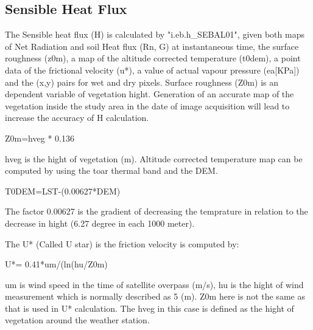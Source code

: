 \subsection{Sensible Heat Flux}
The Sensible heat flux (H) is calculated by "i.eb.h\_SEBAL01", given both maps of Net Radiation and soil Heat flux (Rn, G) at instantaneous time, the surface roughness (z0m), a map of the altitude corrected temperature (t0dem), a point data of the frictional velocity (u*), a value of actual vapour pressure (ea[KPa]) and the (x,y) pairs for wet and dry pixels.\newline
Surface roughness (Z0m) is an dependent variable of vegetation hight. Generation of an accurate map of the vegetation inside the study area in the date of image acquisition will lead to increase the accuracy of H calculation.\newline
\begin{smallverbatim}
    Z0m=hveg * 0.136 
\end{smallverbatim}
hveg is the hight of vegetation (m).\newline
Altitude corrected temperature map can be computed by using the toar thermal band and the DEM.\newline
\begin{smallverbatim}
    T0DEM=LST-(0.00627*DEM)
\end{smallverbatim}
The factor 0.00627 is the gradient of decreasing the temprature in relation to the decrease in hight (6.27 degree in each 1000 meter).\newline

The U* (Called U star) is the friction velocity is computed by:\newline
\begin{smallverbatim}
    U*= 0.41*um/(ln(hu/Z0m) 
\end{smallverbatim}
um is wind speed in the time of satellite overpass (m/s), hu is the hight of wind measurement which is normally described as 5 (m). Z0m here is not the same as that is used in  U* calculation. The  hveg in this case is defined as the hight of vegetation around the weather station.\newline

